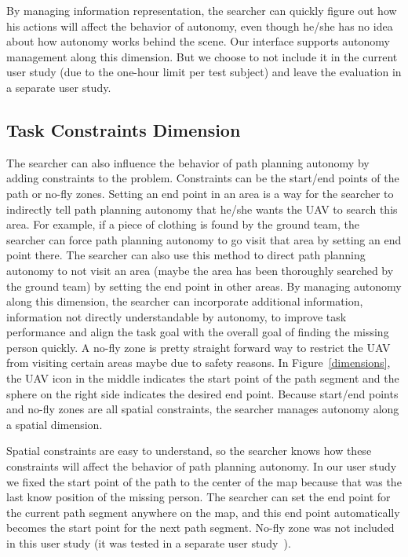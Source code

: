 \documentclass[journal]{IEEEtran}
\begin{document}
By managing information representation, the searcher can quickly figure out how his actions will affect the behavior of autonomy, even though he/she has no idea about how autonomy works behind the scene. Our interface supports autonomy management along this dimension. But we choose to not include it in the current user study (due to the one-hour limit per test subject) and leave the evaluation in a separate user study.

\subsection{Task Constraints Dimension}

The searcher can also influence the behavior of path planning autonomy by adding constraints to the problem. Constraints can be the start/end points of the path or no-fly zones. Setting an end point in an area is a way for the searcher to indirectly tell path planning autonomy that he/she wants the UAV to search this area. For example, if a piece of clothing is found by the ground team, the searcher can force path planning autonomy to go visit that area by setting an end point there. The searcher can also use this method to direct path planning autonomy to not visit an area (maybe the area has been thoroughly searched by the ground team) by setting the end point in other areas. By managing autonomy along this dimension, the searcher can incorporate additional information, information not directly understandable by autonomy, to improve task performance and align the task goal with the overall goal of finding the missing person quickly. A no-fly zone is pretty straight forward way to restrict the UAV from visiting certain areas maybe due to safety reasons. In Figure~\ref{dimensions}, the UAV icon in the middle indicates the start point of the path segment and the sphere on the right side indicates the desired end point. Because start/end points and no-fly zones are all spatial constraints, the searcher manages autonomy along a spatial dimension.

Spatial constraints are easy to understand, so the searcher knows how these constraints will affect the behavior of path planning autonomy. In our user study we fixed the start point of the path to the center of the map because that was the last know position of the missing person. The searcher can set the end point for the current path segment anywhere on the map, and this end point automatically becomes the start point for the next path segment. No-fly zone was not included in this user study (it was tested in a separate user study~\cite{Clark2013Hierarchical}).
\end{document}

